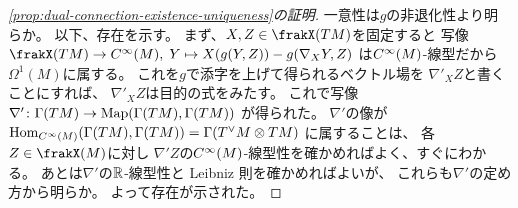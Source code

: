\documentclass[report]{jlreq}
\begin{document}
\begin{proof}[\cref{prop:dual-connection-existence-uniqueness}の証明]
    一意性は$g$の非退化性より明らか。
    以下、存在を示す。
    まず、$X, Z \in \frakX(TM)$を固定すると
    写像$\frakX(TM) \to \smooth(M), \;
        Y \mapsto X(g(Y, Z)) - g(\nabla_X Y, Z)$
    は$C^\infty(M)$-線型だから$\Omega^1(M)$に属する。
    これを$g$で添字を上げて得られるベクトル場を
    $\nabla'_X Z$と書くことにすれば、
    $\nabla'_X Z$は目的の式をみたす。
    これで写像$\nabla' \colon \Gamma(TM) \to \operatorname{Map}(\Gamma(TM), \Gamma(TM))$
    が得られた。
    $\nabla'$の像が
    $\operatorname{Hom}_{C^\infty(M)}(\Gamma(TM), \Gamma(TM)) = \Gamma(T^\vee M \otimes TM)$
    に属することは、
    各$Z \in \frakX(M)$に対し
    $\nabla' Z$の$C^\infty(M)$-線型性を確かめればよく、すぐにわかる。
    あとは$\nabla'$の$\mathbb{R}$-線型性と Leibniz 則を確かめればよいが、
    これらも$\nabla'$の定め方から明らか。
    よって存在が示された。
\end{proof}
\end{document}
